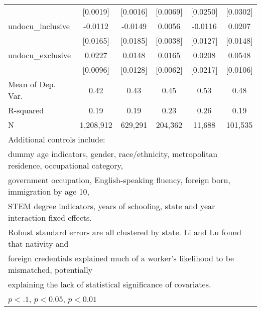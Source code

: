 \begin{table}[htbp]
\begin{tabular}{l*{5}{c}}
                    &    [0.0019]         &    [0.0016]         &    [0.0069]         &    [0.0250]         &    [0.0302]         \\
\addlinespace
undocu\_inclusive    &     -0.0112         &     -0.0149         &      0.0056         &     -0.0116         &      0.0207         \\
                    &    [0.0165]         &    [0.0185]         &    [0.0038]         &    [0.0127]         &    [0.0148]         \\
\addlinespace
undocu\_exclusive    &      0.0227\sym{**} &      0.0148         &      0.0165\sym{**} &      0.0208         &      0.0548\sym{***}\\
                    &    [0.0096]         &    [0.0128]         &    [0.0062]         &    [0.0217]         &    [0.0106]         \\
\midrule
Mean of Dep. Var.   &        0.42         &        0.43         &        0.45         &        0.53         &        0.48         \\
R-squared           &        0.19         &        0.19         &        0.23         &        0.26         &        0.19         \\
N                   &   1,208,912         &     629,291         &     204,362         &      11,688         &     101,535         \\
\bottomrule
\multicolumn{6}{l}{\footnotesize Additional controls include:}\\
\multicolumn{6}{l}{\footnotesize dummy age indicators, gender, race/ethnicity, metropolitan residence, occupational category,}\\
\multicolumn{6}{l}{\footnotesize government occupation, English-speaking fluency, foreign born, immigration by age 10,}\\
\multicolumn{6}{l}{\footnotesize STEM degree indicators, years of schooling, state and year interaction fixed effects.}\\
\multicolumn{6}{l}{\footnotesize Robust standard errors are all clustered by state. Li and Lu found that nativity and}\\
\multicolumn{6}{l}{\footnotesize foreign credentials explained much of a worker's likelihood to be mismatched, potentially}\\
\multicolumn{6}{l}{\footnotesize explaining the lack of statistical significance of covariates.}\\
\multicolumn{6}{l}{\footnotesize \sym{*} \(p<.1\), \sym{**} \(p<0.05\), \sym{***} \(p<0.01\)}\\
\end{tabular}
\end{table}
